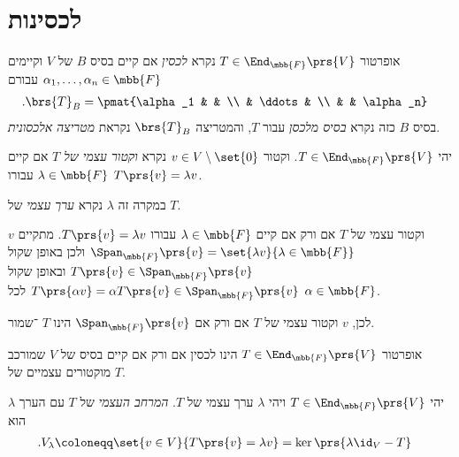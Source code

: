 \documentclass[a4paper,10pt,twoside,openany]{book}
\begin{document}
\section{לכסינות}

\begin{definition}
אופרטור
$T \in \End_{\mbb{F}}\prs{V}$
נקרא
\emph{לכסין}
אם קיים בסיס
$B$
של
$V$
וקיימים
$\alpha_1, \ldots, \alpha_n \in \mbb{F}$
עבורם
\begin{align*}
\text{.} \brs{T}_B &= \pmat{\alpha_1 & & \\ & \ddots &  \\  &  & \alpha_n}
\end{align*}
בסיס
$B$
כזה נקרא
\emph{בסיס מלכסן}
עבור
$T$,
והמטריצה
$\brs{T}_B$
נקראת
\emph{מטריצה אלכסונית}.
\end{definition}

\begin{definition}
יהי
$T \in \End_{\mbb{F}}\prs{V}$.
וקטור
$v \in V \setminus \set{0}$
נקרא
\emph{וקטור עצמי של
$T$}
אם קיים
$\lambda \in \mbb{F}$
עבורו
$T\prs{v} = \lambda v$.

במקרה זה
$\lambda$
נקרא
\emph{ערך עצמי}
של
$T$.
\end{definition}

\begin{remark}
$v$
וקטור עצמי של
$T$
אם ורק אם קיים
$\lambda \in \mbb{F}$
עבורו
$T\prs{v} = \lambda v$.
מתקיים
$\Span_{\mbb{F}}\prs{v} = \set{\lambda v}{\lambda \in \mbb{F}}$
ולכן באופן שקול
$T\prs{v} \in \Span_{\mbb{F}}\prs{v}$
ובאופן שקול
$T\prs{\alpha v} = \alpha T\prs{v} \in \Span_{\mbb{F}}\prs{v}$
לכל
$\alpha \in \mbb{F}$.

לכן,
$v$
וקטור עצמי של
$T$
אם ורק אם
$\Span_{\mbb{F}}\prs{v}$
הינו
$T$%
־שמור.
\end{remark}

\begin{remark}
אופרטור
$T \in \End_{\mbb{F}}\prs{V}$
הינו לכסין אם ורק אם קיים בסיס של
$V$
שמורכב מוקטורים עצמיים של
$T$.
\end{remark}

\begin{definition}
יהי
$T \in \End_{\mbb{F}}\prs{V}$
ויהי
$\lambda$
ערך עצמי של
$T$.
\emph{המרחב העצמי}
של
$T$
עם הערך
$\lambda$
הוא
\begin{align*}
\text{.} V_{\lambda} &\coloneqq \set{v \in V}{T\prs{v} = \lambda v} = \ker\prs{\lambda \id_V - T}
\end{align*}
\end{definition}
\end{document}
